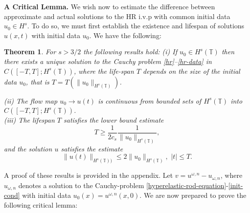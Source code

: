 \documentclass[12pt,reqno]{amsart}
\newcommand{\ci}{\mathbb{T}}
\theoremstyle{plain}  %
\newtheorem{theorem}{Theorem}
\theoremstyle{definition}
\begin{document}
	 
	 {\bf A Critical Lemma.}
	We wish now to estimate the difference between approximate and actual solutions to
	the HR i.v.p with common initial data $u_0 \in H^s$. To do so, we must first
	establish the existence and lifespan of solutions $u(x,t)$ with initial data $u_0$.
	We have the following:
\begin{theorem}
	\label{thm:HR_existence_continous_dependence}
For  $s>3/2$  the following  results  hold:
%
\vskip0.05in
\noindent
(i) If $u_0\in H^s(\ci)$  then  there exists a unique solution to
the Cauchy problem  \eqref{hr}--\eqref{hr-data} 
  in $C([-T, T]; H^s(\ci))$, where the life-span  $T$ depends on the size
  of the initial data $u_0$, that is
  $T=T(\|u_0 \|_{H^s(\ci)})$.
  
  \noindent
(ii)
 The flow  map $u_0 \to u(t)$  is continuous from
 bounded sets of $H^s(\ci)$ into $C([-T, T]; H^s(\ci))$.
%
 \noindent
\\
(iii)  The  lifespan $T$ satisfies the lower bound estimate 
%
     \begin{equation}
   \label{Life-span-est}
T
\ge
\frac{1}{2c_s}
\frac{1}{\|
u_0
  \|_{H^s(\ci)}},
   \end{equation}
and the solution $u$ satisfies the estimate
%
     \begin{equation}
   \label{u_x-Linfty-Hs}
\|
u(t)
  \|_ {H^s(\ci))}
  \le
  2
  \|
u_0
  \|_{H^s(\ci)},\,\, |t|\le T.
   \end{equation}
 \end{theorem}
%
A proof of these results is provided in the appendix.
%
%
%
Let $v=u^{\omega,n} -
u_{\omega,n}$, where $u_{\omega,n}$ denotes a solution to
the Cauchy-problem \eqref{hyperelastic-rod-equation}-\eqref{init-cond} with
initial data $u_0(x) = u^{\omega,n}(x,0)$. We are now prepared to prove the following critical lemma:
\end{document}
